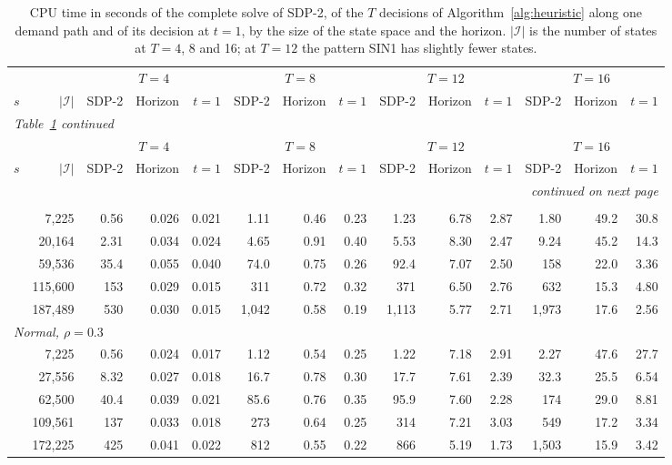 {\footnotesize
\renewcommand{\arraystretch}{0.9}
\setlength{\tabcolsep}{3pt}
\begin{longtable}{lrrrrrrrrrrrrr}
\caption{CPU time in seconds of the complete solve of SDP-2, of the $T$ decisions of Algorithm~\ref{alg:heuristic} along one demand path and of its decision at $t=1$, by the size of the state space and the horizon. $|\mathcal{I}|$ is the number of states at $T=4$, 8 and 16; at $T=12$ the pattern SIN1 has slightly fewer states.}
\label{tab:comp.size} \\
\toprule
 & & \multicolumn{3}{c}{$T=4$} & \multicolumn{3}{c}{$T=8$} & \multicolumn{3}{c}{$T=12$} & \multicolumn{3}{c}{$T=16$} \\
\cmidrule(lr){3-5}\cmidrule(lr){6-8}\cmidrule(lr){9-11}\cmidrule(lr){12-14}
$s$ & $|\mathcal{I}|$ & SDP-2 & Horizon & $t=1$ & SDP-2 & Horizon & $t=1$ & SDP-2 & Horizon & $t=1$ & SDP-2 & Horizon & $t=1$ \\
\midrule
\endfirsthead
\multicolumn{14}{l}{\textit{Table~\ref{tab:comp.size} continued}} \\
\toprule
 & & \multicolumn{3}{c}{$T=4$} & \multicolumn{3}{c}{$T=8$} & \multicolumn{3}{c}{$T=12$} & \multicolumn{3}{c}{$T=16$} \\
\cmidrule(lr){3-5}\cmidrule(lr){6-8}\cmidrule(lr){9-11}\cmidrule(lr){12-14}
$s$ & $|\mathcal{I}|$ & SDP-2 & Horizon & $t=1$ & SDP-2 & Horizon & $t=1$ & SDP-2 & Horizon & $t=1$ & SDP-2 & Horizon & $t=1$ \\
\midrule
\endhead
\midrule
\multicolumn{14}{r}{\textit{continued on next page}} \\
\endfoot
\bottomrule
\endlastfoot
\multicolumn{14}{l}{\textit{Poisson}} \\
\quad 1 & 7,225 & 0.56 & 0.026 & 0.021 & 1.11 & 0.46 & 0.23 & 1.23 & 6.78 & 2.87 & 1.80 & 49.2 & 30.8 \\
\quad 2 & 20,164 & 2.31 & 0.034 & 0.024 & 4.65 & 0.91 & 0.40 & 5.53 & 8.30 & 2.47 & 9.24 & 45.2 & 14.3 \\
\quad 4 & 59,536 & 35.4 & 0.055 & 0.040 & 74.0 & 0.75 & 0.26 & 92.4 & 7.07 & 2.50 & 158 & 22.0 & 3.36 \\
\quad 6 & 115,600 & 153 & 0.029 & 0.015 & 311 & 0.72 & 0.32 & 371 & 6.50 & 2.76 & 632 & 15.3 & 4.80 \\
\quad 8 & 187,489 & 530 & 0.030 & 0.015 & 1,042 & 0.58 & 0.19 & 1,113 & 5.77 & 2.71 & 1,973 & 17.6 & 2.56 \\
\multicolumn{14}{l}{\textit{Normal, $\rho=0.3$}} \\
\quad 1 & 7,225 & 0.56 & 0.024 & 0.017 & 1.12 & 0.54 & 0.25 & 1.22 & 7.18 & 2.91 & 2.27 & 47.6 & 27.7 \\
\quad 2 & 27,556 & 8.32 & 0.027 & 0.018 & 16.7 & 0.78 & 0.30 & 17.7 & 7.61 & 2.39 & 32.3 & 25.5 & 6.54 \\
\quad 3 & 62,500 & 40.4 & 0.039 & 0.021 & 85.6 & 0.76 & 0.35 & 95.9 & 7.60 & 2.28 & 174 & 29.0 & 8.81 \\
\quad 4 & 109,561 & 137 & 0.033 & 0.018 & 273 & 0.64 & 0.25 & 314 & 7.21 & 3.03 & 549 & 17.2 & 3.34 \\
\quad 5 & 172,225 & 425 & 0.041 & 0.022 & 812 & 0.55 & 0.22 & 866 & 5.19 & 1.73 & 1,503 & 15.9 & 3.42 \\
\end{longtable}
}
